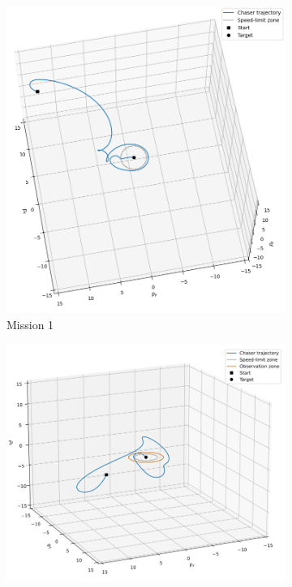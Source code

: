 \begin{figure}[t]
    \centering
    \begin{subfigure}[t]{0.4\linewidth}
        \centering
        \includegraphics[width=\linewidth]{images/ch5/satellite_mission1_traj.png}
        \caption{Mission 1}
    \end{subfigure}
    \begin{subfigure}[t]{0.4\linewidth}
        \centering
        \includegraphics[width=\linewidth]{images/ch5/satellite_mission2_traj.png}

\end{subfigure}
\end{figure}
